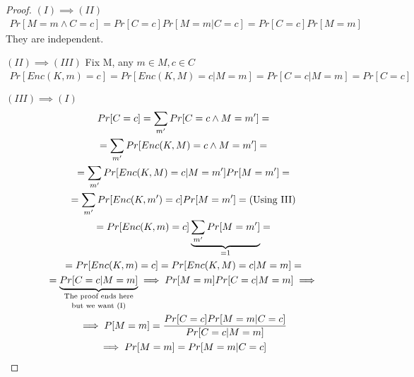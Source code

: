 \begin{proof}

    $(I)\implies(II)$
    \begin{gather*}
        Pr[M=m \wedge C=c]=Pr[C=c]Pr[M=m|C=c]=Pr[C=c]Pr[M=m]   
    \end{gather*}
    They are independent.
    
    $(II)\implies(III)$
    Fix M, any $m\in M, c\in C$
    \begin{gather*}
        Pr[Enc(K,m)=c]=Pr[Enc(K,M)=c|M=m]=Pr[C=c|M=m]=Pr[C=c]   
    \end{gather*}

    $(III)\implies(I)$
    \begin{gather*}
        Pr[C=c]=\sum_{m'}Pr[C=c\wedge M=m']=\\
        =\sum_{m'}Pr[Enc(K,M)=c\wedge M=m']=\\
        =\sum_{m'}Pr[Enc(K,M)=c| M=m']Pr[M=m']=\\
        =\sum_{m'}Pr[Enc(K,m')=c]Pr[M=m']= \text{(Using III)}\\
        =Pr[Enc(K,m)=c]\underbrace{\sum_{m'}Pr[M=m']}_{=1}=\\
        =Pr[Enc(K,m)=c]=Pr[Enc(K,M)=c|M=m]=\\
        =\underbrace{Pr[C=c|M=m]}_{\text{\shortstack{The proof ends here\\but we want (I)}}}\implies Pr[M=m]Pr[C=c|M=m]\implies\\
        \implies P[M=m]=\frac{Pr[C=c]Pr[M=m|C=c]}{Pr[C=c|M=m]}\\
        \implies Pr[M=m]=Pr[M=m|C=c]
    \end{gather*}
\end{proof}

